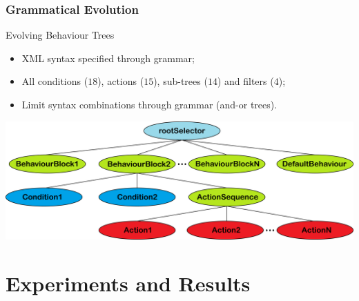 \documentclass{beamer}
\begin{document}

\begin{frame}{}
	\frametitle{Grammatical Evolution}
	\begin{block}{Evolving Behaviour Trees}
		\begin{itemize}
			\item XML syntax specified through grammar;
			\item All conditions ($18$), actions ($15$), sub-trees ($14$) and filters ($4$);
			\item Limit syntax combinations through grammar (and-or trees).
		\end{itemize}
		\begin{center}
			\includegraphics[width=.65\textwidth]{defaultTree}
		\end{center}
	\end{block}
	\vfill
\end{frame}

\section{Experiments and Results}
\end{document}
